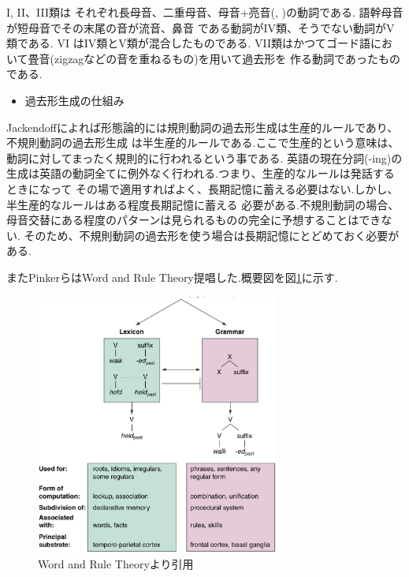 I, I\hspace{-.1em}I、I\hspace{-.1em}I\hspace{-.1em}I類は
それぞれ長母音、二重母音、母音+亮音(, )の動詞である.
語幹母音が短母音でその末尾の音が流音、鼻音
である動詞がI\hspace{-.1em}V類、そうでない動詞がV類である. V\hspace{-.1em}I
はI\hspace{-.1em}V類とV類が混合したものである.
V\hspace{-.1em}I\hspace{-.1em}I類はかつてゴード語において畳音(zigzagなどの音を重ねるもの)を用いて過去形を
作る動詞であったものである.



\begin{itemize}
\item 過去形生成の仕組み
\end{itemize}
Jackendoff\cite{jack}によれば形態論的には規則動詞の過去形生成は生産的ルールであり、不規則動詞の過去形生成
は半生産的ルールである.ここで生産的という意味は、動詞に対してまったく規則的に行われるという事である.
英語の現在分詞(-ing)の生成は英語の動詞全てに例外なく行われる.つまり、生産的なルールは発話するときになって
その場で適用すればよく、長期記憶に蓄える必要はない.しかし、半生産的なルールはある程度長期記憶に蓄える
必要がある.不規則動詞の場合、母音交替にある程度のパターンは見られるものの完全に予想することはできない.
そのため、不規則動詞の過去形を使う場合は長期記憶にとどめておく必要がある.

またPinkerらはWord and Rule Theory\cite{pinker3}提唱した.概要図を図\ref{fig:word_rule}に示す.

\begin{figure}[htbp]
 \centering
 \includegraphics[width=8cm]{word-rule.eps}
 \caption{Word and Rule Theory\cite{pinker3}より引用\label{fig:word_rule}}
\end{figure}

